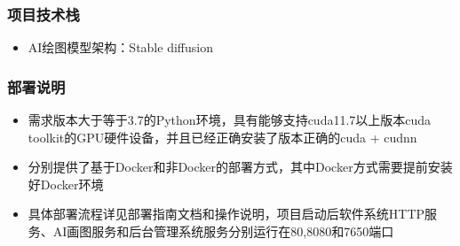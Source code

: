\begin{frame}
    \frametitle{项目技术栈}
    \begin{itemize}
        \item AI绘图模型架构：Stable diffusion
    \end{itemize}
\end{frame}

\begin{frame}
    \frametitle{部署说明}
    \begin{itemize}
        \item 需求版本大于等于3.7的Python环境，具有能够支持cuda11.7以上版本cuda toolkit的GPU硬件设备，并且已经正确安装了版本正确的cuda + cudnn
        \item 分别提供了基于Docker和非Docker的部署方式，其中Docker方式需要提前安装好Docker环境
        \item 具体部署流程详见部署指南文档和操作说明，项目启动后软件系统HTTP服务、AI画图服务和后台管理系统服务分别运行在80,8080和7650端口
    \end{itemize}
\end{frame}